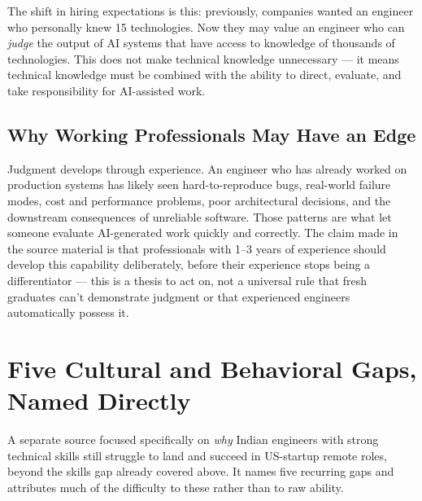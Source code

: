 \begin{keytakeaway}
The shift in hiring expectations is this: previously, companies wanted an engineer who personally knew 15
technologies. Now they may value an engineer who can \emph{judge} the output of AI systems that have access to
knowledge of thousands of technologies. This does not make technical knowledge unnecessary --- it means technical
knowledge must be combined with the ability to direct, evaluate, and take responsibility for AI-assisted work.
\end{keytakeaway}

\subsection{Why Working Professionals May Have an Edge}

Judgment develops through experience. An engineer who has already worked on production systems has likely seen
hard-to-reproduce bugs, real-world failure modes, cost and performance problems, poor architectural decisions, and
the downstream consequences of unreliable software. Those patterns are what let someone evaluate AI-generated
work quickly and correctly. The claim made in the source material is that professionals with 1--3 years of
experience should develop this capability deliberately, before their experience stops being a differentiator ---
this is a thesis to act on, not a universal rule that fresh graduates can't demonstrate judgment or that
experienced engineers automatically possess it.

\section{Five Cultural and Behavioral Gaps, Named Directly}

A separate source focused specifically on \emph{why} Indian engineers with strong technical skills still
struggle to land and succeed in US-startup remote roles, beyond the skills gap already covered above. It names
five recurring gaps and attributes much of the difficulty to these rather than to raw ability.

